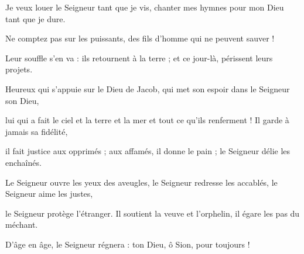 \item Je veux louer le Seigneur tant que je vis, chanter mes hymnes pour mon Dieu tant que je dure.

\item Ne comptez pas sur les puissants, des fils d'homme qui ne peuvent sauver !

\item Leur souffle s'en va : ils retournent à la terre ; et ce jour-là, périssent leurs projets.

\item Heureux qui s'appuie sur le Dieu de Jacob, qui met son espoir dans le Seigneur son Dieu,

\item lui qui a fait le ciel et la terre et la mer et tout ce qu'ils renferment ! Il garde à jamais sa fidélité,

\item il fait justice aux opprimés ; aux affamés, il donne le pain ; le Seigneur délie les enchaînés.

\item Le Seigneur ouvre les yeux des aveugles, le Seigneur redresse les accablés, le Seigneur aime les justes,

\item le Seigneur protège l'étranger. Il soutient la veuve et l'orphelin, il égare les pas du méchant.

\item D'âge en âge, le Seigneur régnera : ton Dieu, ô Sion, pour toujours !